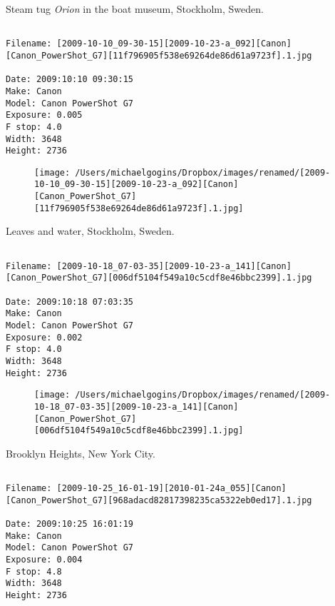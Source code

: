 \documentclass[11pt,letter,DIV=14,paper=landscape]{scrbook}
\begin{document}
\clearpage
\noindent Steam tug \emph{Orion} in the boat museum, Stockholm, Sweden.
\noindent
\begin{lstlisting}

Filename: [2009-10-10_09-30-15][2009-10-23-a_092][Canon][Canon_PowerShot_G7][11f796905f538e69264de86d61a9723f].1.jpg

Date: 2009:10:10 09:30:15
Make: Canon
Model: Canon PowerShot G7
Exposure: 0.005
F stop: 4.0
Width: 3648
Height: 2736
\end{lstlisting}
\clearpage

\begin{figure}
\texttt{[image: /Users/michaelgogins/Dropbox/images/renamed/[2009-10-10\_09-30-15][2009-10-23-a\_092][Canon][Canon\_PowerShot\_G7][11f796905f538e69264de86d61a9723f].1.jpg]}
\end{figure}
    
\clearpage
\noindent Leaves and water, Stockholm, Sweden.
\noindent
\begin{lstlisting}

Filename: [2009-10-18_07-03-35][2009-10-23-a_141][Canon][Canon_PowerShot_G7][006df5104f549a10c5cdf8e46bbc2399].1.jpg

Date: 2009:10:18 07:03:35
Make: Canon
Model: Canon PowerShot G7
Exposure: 0.002
F stop: 4.0
Width: 3648
Height: 2736
\end{lstlisting}
\clearpage

\begin{figure}
\texttt{[image: /Users/michaelgogins/Dropbox/images/renamed/[2009-10-18\_07-03-35][2009-10-23-a\_141][Canon][Canon\_PowerShot\_G7][006df5104f549a10c5cdf8e46bbc2399].1.jpg]}
\end{figure}
    
\clearpage
\noindent Brooklyn Heights, New York City.
\noindent
\begin{lstlisting}

Filename: [2009-10-25_16-01-19][2010-01-24a_055][Canon][Canon_PowerShot_G7][968adacd82817398235ca5322eb0ed17].1.jpg

Date: 2009:10:25 16:01:19
Make: Canon
Model: Canon PowerShot G7
Exposure: 0.004
F stop: 4.8
Width: 3648
Height: 2736
\end{lstlisting}
\clearpage
\end{document}
